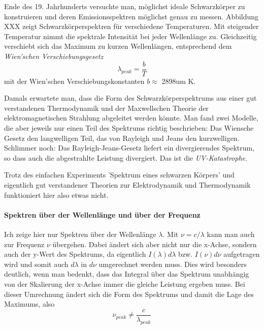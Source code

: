 Ende des 19. Jahrhunderts versuchte man, möglichst ideale Schwarzkörper zu konstruieren und deren Emissionsspektren möglichst genau zu messen. Abbildung XXX zeigt Schwarzkörperspektren für verschiedene Temperaturen. Mit steigender Temperatur nimmt die spektrale Intensität bei jeder Wellenlänge zu. Gleichzeitig verschiebt sich das Maximum zu kurzen Wellenlängen, entsprechend dem \emph{Wien'schen Verschiebungsgesetz}
\begin{equation}
    \lambda_{peak} = \frac{b}{T}
\end{equation}
mit der Wien'schen Verschiebungskonstanten $b \approx $ \si{2898}{um K}.

Damals erwartete man, dass die Form des Schwarzkörperspektrums aus einer gut verstandenen Thermodynamik und der Maxwellschen Theorie der elektromagnetischen Strahlung abgeleitet werden könnte. Man fand zwei Modelle, die aber jeweils nur einen Teil des Spektrums richtig beschrieben: Das Wiensche Gesetz den langwelligen Teil, das von Rayleigh und Jeans den kurzwelligen. Schlimmer noch: Das Rayleigh-Jeans-Gesetz liefert ein divergierendes Spektrum, so dass auch die abgestrahlte Leistung divergiert. Das ist die \emph{UV-Katastrophe}.

Trotz des einfachen Experiments 'Spektrum eines schwarzen Körpers' und eigentlich gut verstandener Theorien zur Elektrodynamik und Thermodynamik funktioniert hier also etwas nicht.


\paragraph*{Spektren über der Wellenlänge und über der Frequenz} Ich zeige hier nur Spektren über der Wellenlänge $\lambda$. Mit $\nu = c / \lambda$ kann man auch zur Frequenz $\nu$ übergehen. Dabei ändert sich aber nicht nur die x-Achse, sondern auch der y-Wert des Spektrums, da eigentlich $I(\lambda) d\lambda$ bzw. $I(\nu) d\nu$ aufgetragen wird und somit auch $d\lambda$ in $d\nu$ umgerechnet werden muss. Dies wird besonders deutlich, wenn man bedenkt, dass das Integral über das Spektrum unabhängig von der Skalierung der x-Achse immer die gleiche Leistung ergeben muss. Bei dieser Umrechnung ändert sich die Form des Spektrums und damit die Lage des Maximums, also 
\begin{equation}
    \nu_{peak} \neq \frac{c}{\lambda_{peak}}
\end{equation}

